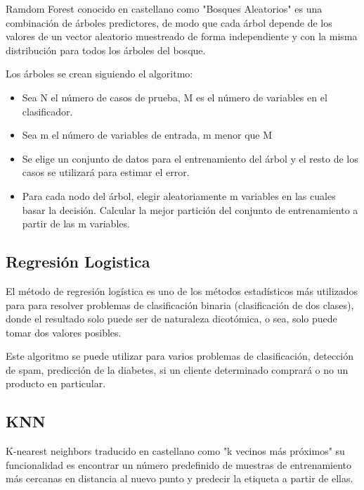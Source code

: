 Ramdom Forest conocido en castellano como "Bosques Aleatorios" es una combinación de árboles predictores, de modo que cada árbol depende de los valores de un vector aleatorio muestreado de forma independiente y con la misma distribución para todos los árboles del bosque.

Los árboles se crean siguiendo el algoritmo:


\begin{itemize}
\item Sea N el número de casos de prueba, M es el número de variables en el clasificador.
\item Sea m el número de variables de entrada, m menor que M
\item Se elige un conjunto de datos para el entrenamiento del árbol y el resto de los casos se utilizará para estimar el error.
\item Para cada nodo del árbol, elegir aleatoriamente m variables en las cuales basar la decisión. Calcular la mejor partición del conjunto de entrenamiento a partir de las m variables.
\end{itemize}

\subsection{Regresión Logistica}

El método de regresión logística es uno de los métodos estadísticos más utilizados para para resolver problemas de clasificación binaria (clasificación de dos clases), donde el resultado solo puede ser de naturaleza dicotómica, o sea, solo puede tomar dos valores posibles.

Este algoritmo se puede utilizar para varios problemas de clasificación, detección de spam, predicción de la diabetes, si un cliente determinado comprará o no un producto en particular.

\subsection{KNN}

K-nearest neighbors traducido en castellano como "k vecinos más próximos" su funcionalidad es encontrar un número predefinido de muestras de entrenamiento más cercanas en distancia al nuevo punto y predecir la etiqueta a partir de ellas. 


